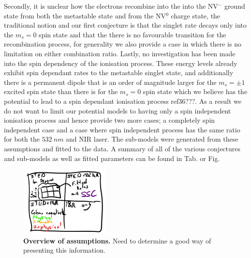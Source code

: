 \documentclass[preprint,prl]{revtex4}
\begin{document}
Secondly, it is unclear how the electrons recombine into the into the NV$^-$ ground state from both the metastable state and from the NV$^0$ charge state, the traditional notion and our first conjecture is that the singlet rate decays only into the $m_s=0$ spin state and that the there is no favourable transition for the recombination process, for generality we also provide a case in which there is no limitation on either combination ratio.  Lastly, no investigation has been made into the spin dependency of the ionisation process. These energy levels already exhibit spin dependant rates to the metastable singlet state, and additionally there is a permanent dipole that is an order of magnitude larger for the $m_s = \pm1$ excited spin state than there is for the $m_s=0$ spin state which we believe has the potential to lead to a spin dependant ionisation process ref36???. As a result we do not want to limit our potential models to having only a spin independent ionisation process and hence provide two more cases; a completely spin independent case and a case where spin independent process has the same ratio for both the $\SI{532}{nm}$ and NIR laser. The sub-models were generated from these assumptions and fitted to the data. A summary of all of the various conjectures and sub-models as well as fitted parameters can be found in Tab. or Fig.

\begin{figure}[H]
  \centering
  \includegraphics[width=0.4\textwidth]{SubModels.png} 
 \caption{\textbf{Overview of assumptions.} Need to determine a good way of presenting this information.} \label{FigSubModels}
\end{figure}
\end{document}
